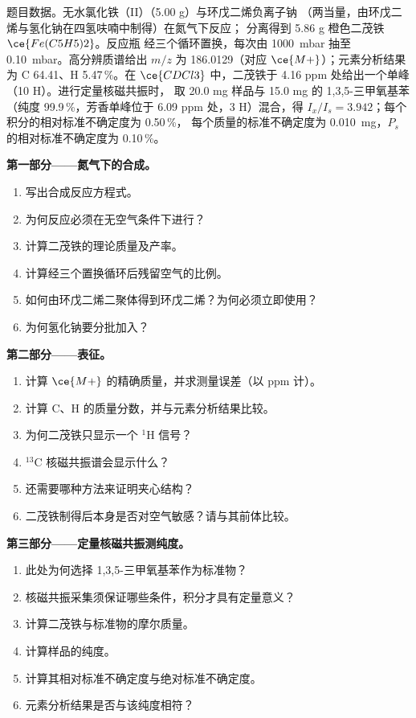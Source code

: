 \begin{problem}
\label{pb:b3:lab-techniques-3:1}
题目数据。无水氯化铁（II）（5.00 g）与环戊二烯负离子钠
（两当量，由环戊二烯与氢化钠在四氢呋喃中制得）在氮气下反应；
分离得到 5.86 g 橙色二茂铁 $\ce{Fe(C5H5)2}$。反应瓶
经三个循环置换，每次由 \qty{1000}{mbar} 抽至 \qty{0.10}{mbar}。高分辨质谱给出 $m/z$ 为 186.0129（对应 $\ce{M+}$）；元素分析结果
为 C 64.41、H 5.47\,\%。在 $\ce{CDCl3}$ 中，二茂铁于 4.16 ppm 处给出一个单峰（10 H）。进行定量核磁共振时，
取 20.0 mg 样品与 15.0 mg 的 1,3,5-三甲氧基苯（纯度 99.9\,\%，芳香单峰位于
6.09 ppm 处，3 H）混合，得 $I_x/I_s = 3.942$；每个积分的相对标准不确定度为 0.50\,\%，
每个质量的标准不确定度为 \qty{0.010}{mg}，$P_s$ 的相对标准不确定度为 0.10\,\%。

\medskip\noindent\textbf{第一部分——氮气下的合成。}
\begin{enumerate}
  \item 写出合成反应方程式。
  \item 为何反应必须在无空气条件下进行？
  \item 计算二茂铁的理论质量及产率。
  \item 计算经三个置换循环后残留空气的比例。
  \item 如何由环戊二烯二聚体得到环戊二烯？为何必须立即使用？
  \item 为何氢化钠要分批加入？
\end{enumerate}

\medskip\noindent\textbf{第二部分——表征。}
\begin{enumerate}[resume]
  \item 计算 $\ce{M+}$ 的精确质量，并求测量误差（以 ppm 计）。
  \item 计算 C、H 的质量分数，并与元素分析结果比较。
  \item 为何二茂铁只显示一个 $^1$H 信号？
  \item $^{13}$C 核磁共振谱会显示什么？
  \item 还需要哪种方法来证明夹心结构？
  \item 二茂铁制得后本身是否对空气敏感？请与其前体比较。
\end{enumerate}

\medskip\noindent\textbf{第三部分——定量核磁共振测纯度。}
\begin{enumerate}[resume]
  \item 此处为何选择 1,3,5-三甲氧基苯作为标准物？
  \item 核磁共振采集须保证哪些条件，积分才具有定量意义？
  \item 计算二茂铁与标准物的摩尔质量。
  \item 计算样品的纯度。
  \item 计算其相对标准不确定度与绝对标准不确定度。
  \item 元素分析结果是否与该纯度相符？
\end{enumerate}


\end{problem}
